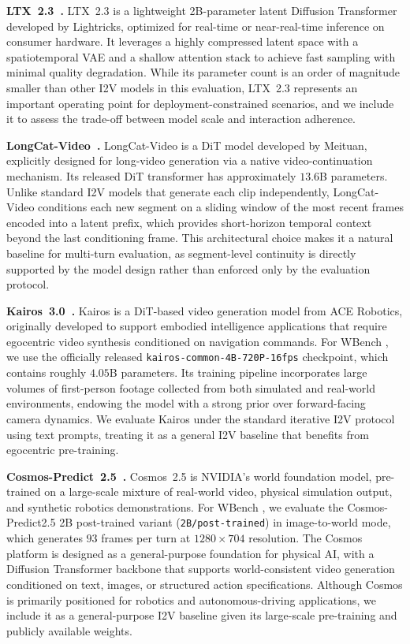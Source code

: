 \documentclass{llmxive}
\providecommand{\myparagraph}[1]{\vspace{-0.1em}\noindent\textbf{#1}\hspace{0.3em}}
\providecommand{\benchmark}{WBench }
\begin{document}
\myparagraph{LTX~2.3~\cite{lightricks2025ltx}.}
LTX~2.3 is a lightweight 2B-parameter latent Diffusion Transformer developed by Lightricks, optimized for real-time or near-real-time inference on consumer hardware.
It leverages a highly compressed latent space with a spatiotemporal VAE and a shallow attention stack to achieve fast sampling with minimal quality degradation.
While its parameter count is an order of magnitude smaller than other I2V models in this evaluation, LTX~2.3 represents an important operating point for deployment-constrained scenarios, and we include it to assess the trade-off between model scale and interaction adherence.

\myparagraph{LongCat-Video~\cite{cai2025longcat}.}
LongCat-Video is a DiT model developed by Meituan, explicitly designed for long-video generation via a native video-continuation mechanism.
Its released DiT transformer has approximately $13.6$B parameters.
Unlike standard I2V models that generate each clip independently, LongCat-Video conditions each new segment on a sliding window of the most recent frames encoded into a latent prefix, which provides short-horizon temporal context beyond the last conditioning frame.
This architectural choice makes it a natural baseline for multi-turn evaluation, as segment-level continuity is directly supported by the model design rather than enforced only by the evaluation protocol.

\myparagraph{Kairos~3.0~\cite{ace2026kairos}.}
Kairos is a DiT-based video generation model from ACE Robotics, originally developed to support embodied intelligence applications that require egocentric video synthesis conditioned on navigation commands.
For \benchmark, we use the officially released \texttt{kairos-common-4B-720P-16fps} checkpoint, which contains roughly $4.05$B parameters.
Its training pipeline incorporates large volumes of first-person footage collected from both simulated and real-world environments, endowing the model with a strong prior over forward-facing camera dynamics.
We evaluate Kairos under the standard iterative I2V protocol using text prompts, treating it as a general I2V baseline that benefits from egocentric pre-training.

\myparagraph{Cosmos-Predict~2.5~\cite{nvidia2025cosmos}.}
Cosmos~2.5 is NVIDIA's world foundation model, pre-trained on a large-scale mixture of real-world video, physical simulation output, and synthetic robotics demonstrations.
For \benchmark, we evaluate the Cosmos-Predict2.5 2B post-trained variant (\texttt{2B/post-trained}) in image-to-world mode, which generates $93$ frames per turn at $1280\times704$ resolution.
The Cosmos platform is designed as a general-purpose foundation for physical AI, with a Diffusion Transformer backbone that supports world-consistent video generation conditioned on text, images, or structured action specifications.
Although Cosmos is primarily positioned for robotics and autonomous-driving applications, we include it as a general-purpose I2V baseline given its large-scale pre-training and publicly available weights.
\end{document}
